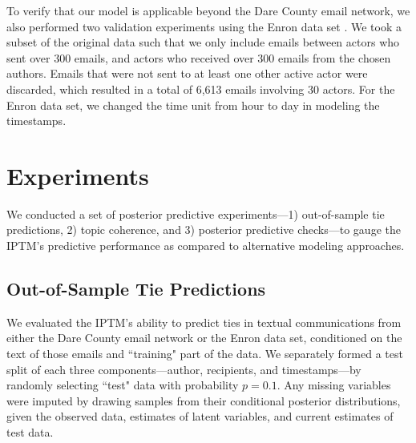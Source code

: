 \documentclass{article}
\begin{document}
 	   To verify that our model is applicable beyond the Dare County email network, we also performed two validation experiments using the Enron data set \cite{klimt2004introducing}. We took a subset of the original data such that we only include emails between actors who sent over 300 emails, and actors who received over 300 emails from the chosen authors. Emails that were not sent to at least one other active actor were discarded, which resulted in a total of 6,613 emails involving 30 actors. For the Enron data set, we changed the time unit from hour to day in modeling the timestamps.
 	   
 	   \section{Experiments}\label{sec:Experiments}
 	   We conducted a set of posterior predictive experiments---1) out-of-sample tie predictions, 2) topic coherence, and 3) posterior predictive checks---to gauge the IPTM's predictive performance as compared to alternative modeling approaches.
 	   
 	   \subsection{Out-of-Sample Tie Predictions}\label{subsec:Tie Prediction}
 	   We evaluated the IPTM's ability to predict ties in textual communications from either the Dare County email network or the Enron data set, conditioned on the text of those emails and ``training" part of the data. We separately formed a test split of each three components---author, recipients, and timestamps---by randomly selecting ``test" data with probability $p=0.1$. Any missing variables were imputed by drawing samples from their conditional posterior distributions, given the observed data, estimates of latent variables, and current estimates of test data. 
 	   
\end{document}
